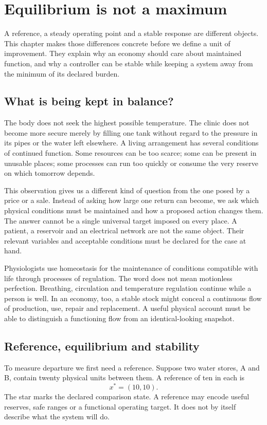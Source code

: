 \chapter{Equilibrium is not a maximum}\label{ch:equilibrium}

A reference, a steady operating point and a stable response are different objects. This chapter makes those differences concrete before we define a unit of improvement. They explain why an economy should care about maintained function, and why a controller can be stable while keeping a system away from the minimum of its declared burden.


\section{What is being kept in balance?}
The body does not seek the highest possible temperature. The clinic does not become more secure merely by filling one tank without regard to the pressure in its pipes or the water left elsewhere. A living arrangement has several conditions of continued function. Some resources can be too scarce; some can be present in unusable places; some processes can run too quickly or consume the very reserve on which tomorrow depends.

This observation gives us a different kind of question from the one posed by a price or a sale. Instead of asking how large one return can become, we ask which physical conditions must be maintained and how a proposed action changes them. The answer cannot be a single universal target imposed on every place. A patient, a reservoir and an electrical network are not the same object. Their relevant variables and acceptable conditions must be declared for the case at hand.

Physiologists use homeostasis for the maintenance of conditions compatible with life through processes of regulation. The word does not mean motionless perfection. Breathing, circulation and temperature regulation continue while a person is well. In an economy, too, a stable stock might conceal a continuous flow of production, use, repair and replacement. A useful physical account must be able to distinguish a functioning flow from an identical-looking snapshot.

\section{Reference, equilibrium and stability}
To measure departure we first need a reference. Suppose two water stores, A and B, contain twenty physical units between them. A reference of ten in each is
\begin{equation}
 x^*=(10,10).
\end{equation}
The star marks the declared comparison state. A reference may encode useful reserves, safe ranges or a functional operating target. It does not by itself describe what the system will do.

